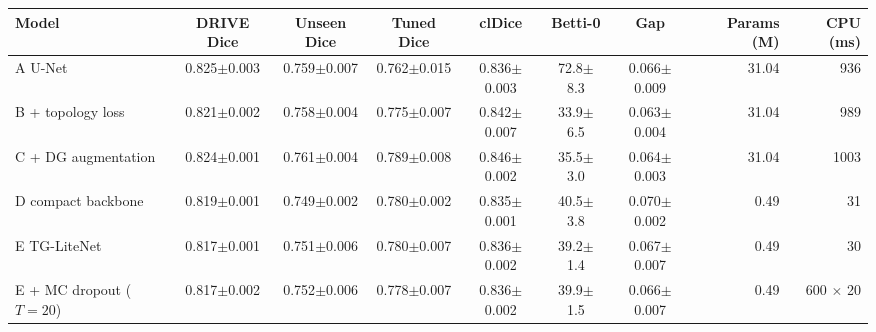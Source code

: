 \begin{tabular}{l ccc c c c rr}
\toprule
Model & DRIVE Dice & Unseen Dice & Tuned Dice & clDice & Betti-0 & Gap & Params (M) & CPU (ms) \\
\midrule
A  U-Net & 0.825{\scriptsize$\pm$0.003} & 0.759{\scriptsize$\pm$0.007} & 0.762{\scriptsize$\pm$0.015} & 0.836{\scriptsize$\pm$0.003} & 72.8{\scriptsize$\pm$8.3} & 0.066{\scriptsize$\pm$0.009} & 31.04 & 936 \\
B  + topology loss & 0.821{\scriptsize$\pm$0.002} & 0.758{\scriptsize$\pm$0.004} & 0.775{\scriptsize$\pm$0.007} & 0.842{\scriptsize$\pm$0.007} & 33.9{\scriptsize$\pm$6.5} & 0.063{\scriptsize$\pm$0.004} & 31.04 & 989 \\
C  + DG augmentation & 0.824{\scriptsize$\pm$0.001} & 0.761{\scriptsize$\pm$0.004} & 0.789{\scriptsize$\pm$0.008} & 0.846{\scriptsize$\pm$0.002} & 35.5{\scriptsize$\pm$3.0} & 0.064{\scriptsize$\pm$0.003} & 31.04 & 1003 \\
D  compact backbone & 0.819{\scriptsize$\pm$0.001} & 0.749{\scriptsize$\pm$0.002} & 0.780{\scriptsize$\pm$0.002} & 0.835{\scriptsize$\pm$0.001} & 40.5{\scriptsize$\pm$3.8} & 0.070{\scriptsize$\pm$0.002} & 0.49 & 31 \\
E  TG-LiteNet & 0.817{\scriptsize$\pm$0.001} & 0.751{\scriptsize$\pm$0.006} & 0.780{\scriptsize$\pm$0.007} & 0.836{\scriptsize$\pm$0.002} & 39.2{\scriptsize$\pm$1.4} & 0.067{\scriptsize$\pm$0.007} & 0.49 & 30 \\
\midrule
E  + MC dropout ($T{=}20$) & 0.817{\scriptsize$\pm$0.002} & 0.752{\scriptsize$\pm$0.006} & 0.778{\scriptsize$\pm$0.007} & 0.836{\scriptsize$\pm$0.002} & 39.9{\scriptsize$\pm$1.5} & 0.066{\scriptsize$\pm$0.007} & 0.49 & 600 $\times$ 20 \\
\bottomrule
\end{tabular}